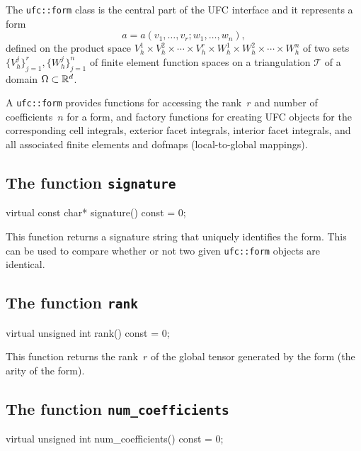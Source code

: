 The \texttt{ufc::form} class is the central part of the UFC interface
and it represents a form
\begin{equation}
  a = a(v_1, \ldots, v_r; w_1, \ldots, w_n),
\end{equation}
defined on the product space $V_h^1 \times V_h^2 \times \cdots \times
V_h^r \times W_h^1 \times W_h^2 \times \cdots \times W_h^n$ of two
sets $\{V_h^j\}_{j=1}^r, \{W_h^j\}_{j=1}^n$ of finite element function
spaces on a triangulation $\mathcal{T}$ of a domain $\Omega \subset
\mathbb{R}^d$.

A \texttt{ufc::form} provides functions for accessing the rank~$r$ and
number of coefficients~$n$ for a form, and factory functions for
creating UFC objects for the corresponding cell integrals, exterior
facet integrals, interior facet integrals, and all associated finite
elements and dofmaps (local-to-global mappings).

\subsection{The function \texttt{signature}}

\begin{code}
virtual const char* signature() const = 0;
\end{code}

This function returns a signature string that uniquely identifies the
form. This can be used to compare whether or not two given
\texttt{ufc::form} objects are identical.

\subsection{The function \texttt{rank}}

\begin{code}
virtual unsigned int rank() const = 0;
\end{code}

This function returns the rank~$r$ of the global tensor generated by
the form (the arity of the form).

\subsection{The function \texttt{num\_coefficients}}

\begin{code}
virtual unsigned int num_coefficients() const = 0;
\end{code}

